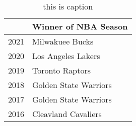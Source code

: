 \begin{table}[]
\centering
\begin{tabular}{|ll|llllllllll|}
\hline
\multicolumn{2}{|l|}{} & \multicolumn{10}{l|}{Winner of NBA Season} \\ \hline
\multicolumn{2}{|l|}{2021} & \multicolumn{10}{l|}{Milwakuee Bucks} \\ \hline
\multicolumn{2}{|l|}{2020} & \multicolumn{10}{l|}{Los Angeles Lakers} \\ \hline
\multicolumn{2}{|l|}{2019} & \multicolumn{10}{l|}{Toronto Raptors} \\ \hline
\multicolumn{2}{|l|}{2018} & \multicolumn{10}{l|}{Golden State Warriors} \\ \hline
\multicolumn{2}{|l|}{2017} & \multicolumn{10}{l|}{Golden State Warriors} \\ \hline
\multicolumn{2}{|l|}{2016} & \multicolumn{10}{l|}{Cleavland Cavaliers} \\ \hline
\end{tabular}
\label{NBA}
\caption{this is caption}
\end{table}